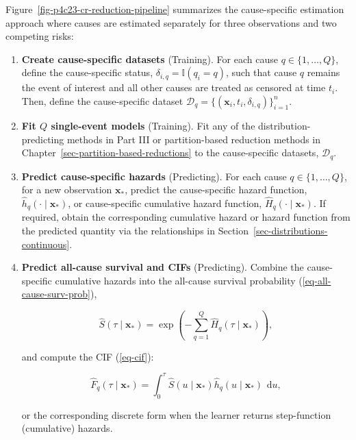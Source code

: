 \documentclass[
  letterpaper,
  krantz2]{style/krantz}
\begin{document}
Figure~\ref{fig-p4c23-cr-reduction-pipeline} summarizes the
cause-specific estimation approach where causes are estimated separately
for three observations and two competing risks:

\begin{enumerate}
\def\labelenumi{\arabic{enumi}.}
\item
  \textbf{Create cause-specific datasets} (Training). For each cause
  \(q \in \{1,\ldots,Q\}\), define the cause-specific status,
  \(\delta_{i,q} = \mathbb{I}(q_i = q)\), such that cause \(q\) remains
  the event of interest and all other causes are treated as censored at
  time \(t_i\). Then, define the cause-specific dataset
  \(\mathcal{D}_q = \{(\mathbf{x}_i, t_i, \delta_{i,q})\}^n_{i=1}\).
\item
  \textbf{Fit \(Q\) single-event models} (Training). Fit any of the
  distribution-predicting methods in Part III or partition-based
  reduction methods in Chapter~\ref{sec-partition-based-reductions} to
  the cause-specific datasets, \(\mathcal{D}_q\).
\item
  \textbf{Predict cause-specific hazards} (Predicting). For each cause
  \(q \in \{1,\ldots,Q\}\), for a new observation \(\mathbf{x}_*\),
  predict the cause-specific hazard function,
  \(\hat{h}_q(\cdot \mid \mathbf{x}_*)\), or cause-specific cumulative
  hazard function, \(\hat{H}_q(\cdot \mid \mathbf{x}_*)\). If required,
  obtain the corresponding cumulative hazard or hazard function from the
  predicted quantity via the relationships in
  Section~\ref{sec-distributions-continuous}.
\item
  \textbf{Predict all-cause survival and CIFs} (Predicting). Combine the
  cause-specific cumulative hazards into the all-cause survival
  probability
  (\ref{eq-all-cause-surv-prob}),

  \[
  \hat{S}(\tau\mid\mathbf{x}_*) = \exp\!\left(-\sum_{q=1}^{Q} \hat{H}_q(\tau\mid\mathbf{x}_*)\right),
  \]

  and compute the CIF (\ref{eq-cif}):

  \[
  \hat{F}_q(\tau \mid \mathbf{x}_*) = \int_{0}^\tau \hat{S}(u \mid \mathbf{x}_*) \hat{h}_q(u \mid \mathbf{x}_*)\ \,\mathrm{d}u,
  \]

  or the corresponding discrete form when the learner returns
  step-function (cumulative) hazards.
\end{enumerate}
\end{document}
